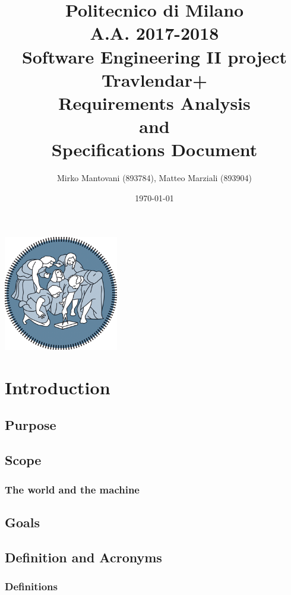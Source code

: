 \documentclass{article}
\author{Mirko Mantovani (893784), Matteo Marziali (893904)}
\date{\today}
\title{Politecnico di Milano
	\\A.A. 2017\@-\@2018
	\\Software Engineering II project \\ \textbf{Travlendar+}
	\\\textbf{R}equirements \textbf{A}nalysis \\and\\ \textbf{S}pecifications \textbf{D}ocument}
\begin{document}
\maketitle
\begin{center}
	\includegraphics[width=5cm]{polimi-logo}
\end{center}
\clearpage
\tableofcontents
\clearpage

\section{Introduction}

\subsection{Purpose}



\newpage
\subsection{Scope}

\subsubsection{The world and the machine}

\clearpage
\subsection{Goals}


\subsection{Definition and Acronyms}

\subsubsection{Definitions}

\end{document}
